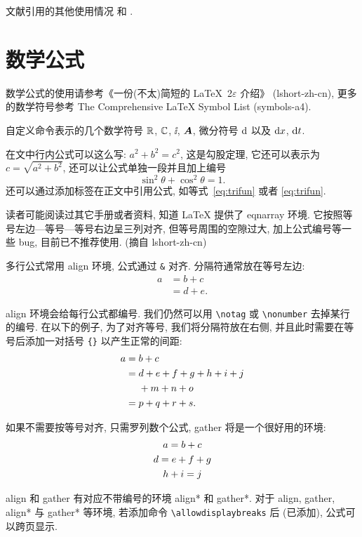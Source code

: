 文献引用的其他使用情况 \cite[定理~1.1]{LiLiu1997} 和 \cite{Shen1994,LiuEtAl2024}.


\section{数学公式}\label{sec:mathEqEnv}

数学公式的使用请参考《一份(不太)简短的 \LaTeX~2$\varepsilon$ 介绍》 (lshort-zh-cn), 更多的数学符号参考 The Comprehensive LaTeX Symbol List (symbols-a4).

自定义命令表示的几个数学符号 $\RR$, $\CC$, $\ii$, $\bA$, 微分符号 $\dif$ 以及 $\dx$, $\dx[t]$.

在文中行内公式可以这么写: $a^2+b^2=c^2$, 这是勾股定理, 它还可以表示为 $c=\sqrt{a^2+b^2}$, 还可以让公式单独一段并且加上编号
\begin{equation}\label{eq:trifun}
\sin^2{\theta}+\cos^2{\theta}=1.
\end{equation}
还可以通过添加标签在正文中引用公式, 如等式~\eqref{eq:trifun} 或者 \ref{eq:trifun}.

读者可能阅读过其它手册或者资料, 知道 LaTeX 提供了 eqnarray 环境. 它按照等号左边—等号—等号右边呈三列对齐, 但等号周围的空隙过大, 加上公式编号等一些 bug, 目前已不推荐使用. (摘自 lshort-zh-cn)

多行公式常用 align 环境, 公式通过 \verb|&| 对齐. 分隔符通常放在等号左边:
\begin{align}
a & = b + c \\
& = d + e.
\end{align}

align 环境会给每行公式都编号. 我们仍然可以用 \verb|\notag| 或 \verb|\nonumber| 去掉某行的编号. 在以下的例子,
为了对齐等号, 我们将分隔符放在右侧, 并且此时需要在等号后添加一对括号 \verb|{}| 以产生正常的间距:
\begin{align}
a ={} & b + c \\
={} & d + e + f + g + h + i + j \notag \\
& + m + n + o \\
={} & p + q + r + s.
\end{align}

如果不需要按等号对齐, 只需罗列数个公式, gather 将是一个很好用的环境:
\begin{gather}
a = b + c \\
d = e + f + g \notag \\
h + i = j
\end{gather}

align 和 gather 有对应不带编号的环境 align* 和 gather*.
对于 align, gather, align* 与 gather* 等环境, 若添加命令 \verb|\allowdisplaybreaks| 后 (已添加), 公式可以跨页显示.

